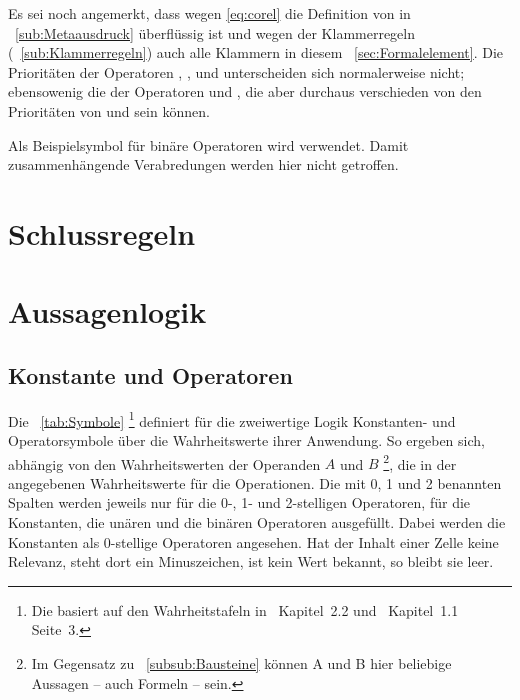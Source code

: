Es sei noch angemerkt, dass wegen \vref{eq:corel} die Definition von \symqt{$\metarep$} in \sectionname~\vref{sub:Metaausdruck} überflüssig ist und wegen der Klammerregeln (\seename \subsectionname~\vref{sub:Klammerregeln}) auch alle Klammern in diesem \sectionname~\ref{sec:Formalelement}.
Die Prioritäten der Operatoren \symqt{$\lrelbsp$}, \symqt{$\rrelbsp$}, \symqt{$\lreleqbsp$} und \symqt{$\rreleqbsp$} unterscheiden sich normalerweise nicht; ebensowenig die der Operatoren \symqt{$\relbsp$} und \symqt{$\releqbsp$}, die aber durchaus verschieden von den Prioritäten von \symqt{$=$} und \symqt{$\ne$} sein können.

Als Beispielsymbol für binäre Operatoren wird \symqt{$\opbsp$} verwendet.
Damit zusammenhängende Verabredungen werden hier nicht getroffen.

\section{Schlussregeln}%
\label{sec:Schlussregeln}


\section{Aussagenlogik}%
\label{sec:Aussagenlogik}

\subsection{Konstante und Operatoren}%
\label{sub:Operatoren}

Die \tablename~\vref{tab:Symbole}
\footnote{%
	Die \tablename{} basiert auf den Wahrheitstafeln in~\cite{bib:Junktor} Kapitel~2.2 und~\cite{bib:Rautenberg} Kapitel~1.1 Seite~3.%
}
definiert für die zweiwertige Logik Konstanten- und Operatorsymbole über die Wahrheitswerte ihrer Anwendung.
So ergeben sich, abhängig von den Wahrheitswerten der Operanden $A$ und $B$
\footnote{%
	Im Gegensatz zu \subsubsectionname~\vref{subsub:Bausteine} können A und B hier beliebige Aussagen -- auch Formeln -- sein.%
},
die in der \tablename{} angegebenen Wahrheitswerte für die Operationen.
Die mit 0, 1 und 2 benannten Spalten werden jeweils nur für die 0-, 1- und 2-stelligen Operatoren, \textdh für die Konstanten, die unären und die binären Operatoren ausgefüllt.
Dabei werden die Konstanten als 0-stellige Operatoren angesehen.
Hat der Inhalt einer Zelle keine Relevanz, steht dort ein Minuszeichen, ist kein Wert bekannt, so bleibt sie leer.

